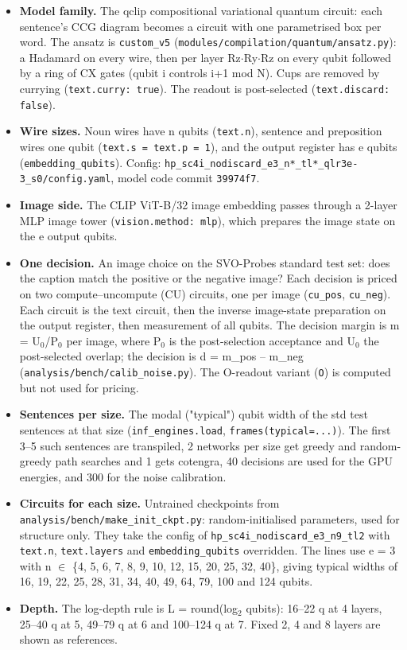 \begin{itemize}
  \item \textbf{Model family.} The qclip compositional variational quantum circuit: each sentence's CCG diagram becomes a circuit with one parametrised box per word. The ansatz is \texttt{custom\_v5} (\texttt{modules/compilation/quantum/ansatz.py}): a Hadamard on every wire, then per layer Rz$\cdot$Ry$\cdot$Rz on every qubit followed by a ring of CX gates (qubit i controls i+1 mod N). Cups are removed by currying (\texttt{text.curry: true}). The readout is post-selected (\texttt{text.discard: false}).
  \item \textbf{Wire sizes.} Noun wires have n qubits (\texttt{text.n}), sentence and preposition wires one qubit (\texttt{text.s = text.p = 1}), and the output register has e qubits (\texttt{embedding\_qubits}). Config: \texttt{hp\_sc4i\_nodiscard\_e3\_n*\_tl*\_qlr3e-3\_s0/config.yaml}, model code commit \texttt{39974f7}.
  \item \textbf{Image side.} The CLIP ViT-B/32 image embedding passes through a 2-layer MLP image tower (\texttt{vision.method: mlp}), which prepares the image state on the e output qubits.
  \item \textbf{One decision.} An image choice on the SVO-Probes standard test set: does the caption match the positive or the negative image? Each decision is priced on two compute--uncompute (CU) circuits, one per image (\texttt{cu\_pos}, \texttt{cu\_neg}). Each circuit is the text circuit, then the inverse image-state preparation on the output register, then measurement of all qubits. The decision margin is m = U$_{0}$/P$_{0}$ per image, where P$_{0}$ is the post-selection acceptance and U$_{0}$ the post-selected overlap; the decision is d = m\_pos -- m\_neg (\texttt{analysis/bench/calib\_noise.py}). The O-readout variant (\texttt{O}) is computed but not used for pricing.
  \item \textbf{Sentences per size.} The modal ("typical") qubit width of the std test sentences at that size (\texttt{inf\_engines.load}, \texttt{frames(typical=...)}). The first 3--5 such sentences are transpiled, 2 networks per size get greedy and random-greedy path searches and 1 gets cotengra, 40 decisions are used for the GPU energies, and 300 for the noise calibration.
  \item \textbf{Circuits for each size.} Untrained checkpoints from \texttt{analysis/bench/make\_init\_ckpt.py}: random-initialised parameters, used for structure only. They take the config of \texttt{hp\_sc4i\_nodiscard\_e3\_n9\_tl2} with \texttt{text.n}, \texttt{text.layers} and \texttt{embedding\_qubits} overridden. The lines use e = 3 with n $\in$ \{4, 5, 6, 7, 8, 9, 10, 12, 15, 20, 25, 32, 40\}, giving typical widths of 16, 19, 22, 25, 28, 31, 34, 40, 49, 64, 79, 100 and 124 qubits.
  \item \textbf{Depth.} The log-depth rule is L = round(log$_{2}$ qubits): 16--22 q at 4 layers, 25--40 q at 5, 49--79 q at 6 and 100--124 q at 7. Fixed 2, 4 and 8 layers are shown as references.

\end{itemize}
